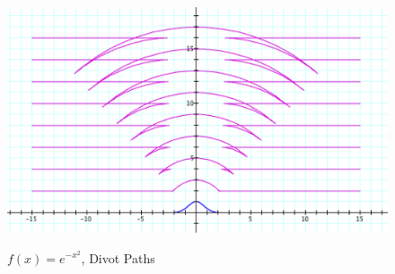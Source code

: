\begin{figure}[h!]
  \centering
  \begin{minipage}[b]{\w}
    \centering
    \label{example:8}
    \includegraphics[width=\fw]{img/03-some-examples/08.png}
    \caption{$f(x) = e^{-x^2}$, Divot Paths}
    \vspace{4ex}
  \end{minipage} %
\end{figure}
